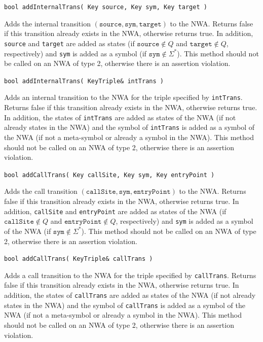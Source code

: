 \documentclass{llncs}
\begin{document}
\begin{description}

  \item\texttt{bool addInternalTrans( Key source, Key sym, Key target )} \nopagebreak

    Adds the internal transition $(\texttt{source},\texttt{sym},\texttt{target})$ to the NWA.  Returns false if this transition already exists in the NWA, otherwise returns true.  In addition, \texttt{source} and \texttt{target} are added as states (if $\texttt{source} \not\in Q$ and $\texttt{target} \not\in Q$, respectively) and \texttt{sym} is added as a symbol (if $\texttt{sym} \not\in \Sigma^*$).  This method should not be called on an NWA of type 2, otherwise there is an assertion violation.

  \item\texttt{bool addInternalTrans( KeyTriple\& intTrans )} \nopagebreak

    Adds an internal transition to the NWA for the triple specified by \texttt{intTrans}.  Returns false if this transition already exists in the NWA, otherwise returns true.  In addition, the states of \texttt{intTrans} are added as states of the NWA (if not already states in the NWA) and the symbol of \texttt{intTrans} is added as a symbol of the NWA (if not a meta-symbol or already a symbol in the NWA).  This method should not be called on an NWA of type 2, otherwise there is an assertion violation.

  \item\texttt{bool addCallTrans( Key callSite, Key sym, Key entryPoint )} \nopagebreak

    Adds the call transition $(\texttt{callSite},\texttt{sym},\texttt{entryPoint})$ to the NWA.  Returns false if this transition already exists in the NWA, otherwise returns true.  In addition, \texttt{callSite} and \texttt{entryPoint} are added as states of the NWA (if $\texttt{callSite} \not\in Q$ and $\texttt{entryPoint} \not\in Q$, respectively) and \texttt{sym} is added as a symbol of the NWA (if $\texttt{sym} \not\in \Sigma^*$).  This method should not be called on an NWA of type 2, otherwise there is an assertion violation.

  \item\texttt{bool addCallTrans( KeyTriple\& callTrans )} \nopagebreak

    Adds a call transition to the NWA for the triple specified by \texttt{callTrans}.  Returns false if this transition already exists in the NWA, otherwise returns true.  In addition, the states of \texttt{callTrans} are added as states of the NWA (if not already states in the NWA) and the symbol of \texttt{callTrans} is added as a symbol of the NWA (if not a meta-symbol or already a symbol in the NWA).  This method should not be called on an NWA of type 2, otherwise there is an assertion violation.


\end{description}
\end{document}
